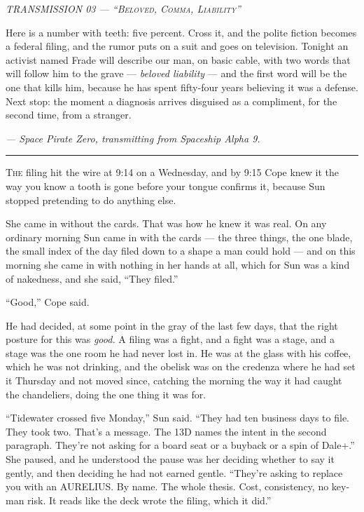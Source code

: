 \documentclass[11pt,openany]{book}
\newcommand{\transheader}{\normalfont\footnotesize\scshape\letterspace}
\newcommand{\letterspace}{}
\newenvironment{transmission}{%
  \par\vspace{0.3\baselineskip}\begin{center}\begin{minipage}{0.88\textwidth}%
  \itshape\small\setlength{\parindent}{0pt}\setstretch{1.06}}%
  {\end{minipage}\end{center}\vspace{0.4\baselineskip}%
  \noindent\hfil\rule{0.35\textwidth}{0.3pt}\hfil\par\vspace{1.0\baselineskip}}
\begin{document}
\begin{transmission}
{\transheader TRANSMISSION 03 --- ``Beloved, Comma, Liability''}\par\vspace{0.5em}
Here is a number with teeth: five percent. Cross it, and the polite fiction becomes a federal filing, and the rumor puts on a suit and goes on television. Tonight an activist named Frade will describe our man, on basic cable, with two words that will follow him to the grave --- \textit{beloved liability} --- and the first word will be the one that kills him, because he has spent fifty-four years believing it was a defense. Next stop: the moment a diagnosis arrives disguised as a compliment, for the second time, from a stranger.\par
\vspace{0.5em}\hfill\textit{--- Space Pirate Zero, transmitting from Spaceship Alpha 9.}\par
\end{transmission}


\lettrine[lines=3, lhang=0.05, nindent=0.25em]{T}{he} filing hit the wire at 9:14 on a Wednesday, and by 9:15 Cope knew it the way you know a tooth is gone before your tongue confirms it, because Sun stopped pretending to do anything else.

She came in without the cards. That was how he knew it was real. On any ordinary morning Sun came in with the cards --- the three things, the one blade, the small index of the day filed down to a shape a man could hold --- and on this morning she came in with nothing in her hands at all, which for Sun was a kind of nakedness, and she said, ``They filed.''

``Good,'' Cope said.

He had decided, at some point in the gray of the last few days, that the right posture for this was \textit{good.} A filing was a fight, and a fight was a stage, and a stage was the one room he had never lost in. He was at the glass with his coffee, which he was not drinking, and the obelisk was on the credenza where he had set it Thursday and not moved since, catching the morning the way it had caught the chandeliers, doing the one thing it was for.

``Tidewater crossed five Monday,'' Sun said. ``They had ten business days to file. They took two. That's a message. The 13D names the intent in the second paragraph. They're not asking for a board seat or a buyback or a spin of Dale+.'' She paused, and he understood the pause was her deciding whether to say it gently, and then deciding he had not earned gentle. ``They're asking to replace you with an AURELIUS. By name. The whole thesis. Cost, consistency, no key-man risk. It reads like the deck wrote the filing, which it did.''
\end{document}
